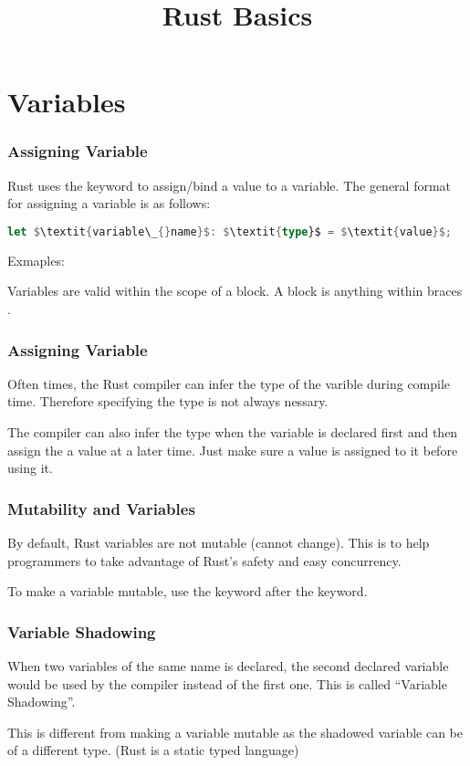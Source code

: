 \documentclass{beamer}
\title{Rust Basics}
\begin{document}
\begin{frame}
  \titlepage{}
\end{frame}

\section{Variables}
\begin{frame}[fragile]
  \frametitle{Assigning Variable}
  Rust uses the  keyword to assign/bind a value to a variable. The general format for assigning a variable is as follows:

\begin{lstlisting}[mathescape=true, language=Rust]
let $\textit{variable\_{}name}$: $\textit{type}$ = $\textit{value}$;
\end{lstlisting}

  Exmaples:
  

  Variables are valid within the scope of a block. A block is anything within braces \inlinecode{\{\}}.
\end{frame}

\begin{frame}[fragile]
  \frametitle{Assigning Variable}
  Often times, the Rust compiler can infer the type of the varible during compile time. Therefore specifying the type is not always nessary.
  

  The compiler can also infer the type when the variable is declared first and then assign the a value at a later time. Just make sure a value is assigned to it before using it.
  
\end{frame}

\begin{frame}
  \frametitle{Mutability and Variables}
  By default, Rust variables are not mutable (cannot change). This is to help programmers to take advantage of Rust's safety and easy concurrency.
  

  To make a variable mutable, use the  keyword after the  keyword.
  
\end{frame}

\begin{frame}
  \frametitle{Variable Shadowing}
  When two variables of the same name is declared, the second declared variable would be used by the compiler instead of the first one. This is called ``Variable Shadowing''.
  

  This is different from making a variable mutable as the shadowed variable can be of a different type. (Rust is a static typed language)
\end{frame}
\end{document}
